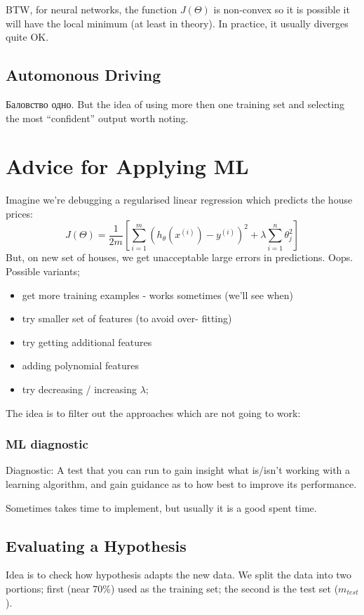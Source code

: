 \documentclass{scrartcl}
\begin{document}
BTW, for neural networks, the function $J(\Theta)$ is non-convex so it
is possible it will have the local minimum (at least in theory). In
practice, it usually diverges quite OK.

\subsection{Automonous Driving}
\label{sec:9-8}
Баловство одно. But the idea of using more then one training set and
selecting the most ``confident'' output worth noting.


\section{Advice for Applying ML}
\label{sec:10}
Imagine we're debugging a regularised linear regression which predicts
the house prices:
\[J(\Theta) = \frac{1}{2m} \left[ \sum\limits_{i=1}^{m}
  (h_\theta(x^{(i)}) - y^{(i)})^2 + \lambda \sum
  \limits_{i=1}^{n}\theta_j^2 \right] \] But, on new set of houses, we
get unacceptable large errors in predictions. Oops. Possible variants;
\begin{itemize}
\item get more training examples - works sometimes (we'll see when)
\item try smaller set of features (to avoid over- fitting)
\item try getting additional features
\item adding polynomial features
\item try decreasing / increasing $\lambda$;
\end{itemize}
The idea is to filter out the approaches which are not going to work:

\subsubsection{ML diagnostic}
Diagnostic: A test that you can run to gain insight what is/isn't
working with a learning algorithm, and gain guidance as to how best to
improve its performance.

Sometimes takes time to implement, but usually it is a good spent
time.

\subsection{Evaluating a Hypothesis}
\label{sec:10-2}
Idea is to check how hypothesis adapts the new data. We split the data
into two portions; first (near 70\%) used as the training set; the
second is the test set ($m_{test}$).
\end{document}
